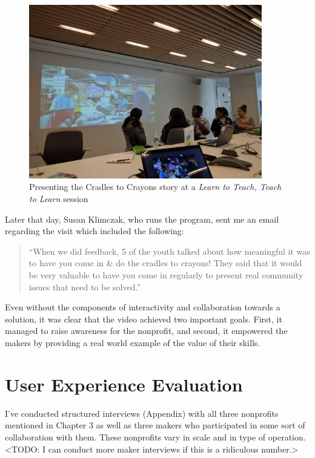    \begin{figure}[thpb]
      \centering
      \includegraphics[width=4in]{figures/learn2teach.jpg}
      \caption{Presenting the Cradles to Crayons story at a \textit{Learn to Teach, Teach to Learn} session}
      \label{fig_setc}
   \end{figure}

Later that day, Susan Klimczak, who runs the program, sent me an email regarding the visit which included the following:

\begin{quotation}

``When we did feedback, 5 of the youth talked about how meaningful it was to have you come in \& do the cradles to crayons! They said that it would be very valuable to have you come in regularly to present real community issues that need to be solved.''

\end{quotation}

Even without the components of interactivity and collaboration towards a solution, it was clear that the video achieved two important goals. First, it managed to raise awareness for the nonprofit, and second, it empowered the makers by providing a real world example of the value of their skills.

\section{User Experience Evaluation}

I've conducted structured interviews (Appendix) with all three nonprofits mentioned in Chapter 3 as well as three makers who participated in some sort of collaboration with them. These nonprofits vary in scale and in type of operation. <TODO: I can conduct more maker interviews if this is a ridiculous number.>

